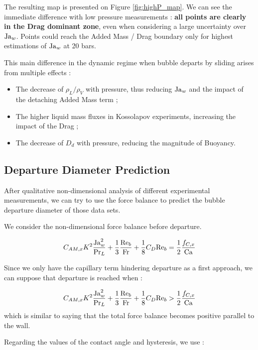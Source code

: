 The resulting map is presented on Figure \ref{fig:highP_map}. We can see the immediate difference with low pressure measurements : \textbf{all points are clearly in the Drag dominant zone}, even when considering a large uncertainty over $\mathrm{Ja}_{w}$. Points could reach the Added Mass / Drag boundary only for highest estimations of $\mathrm{Ja}_{w}$ at 20 bars. 

This main difference in the dynamic regime when bubble departs by sliding arises from multiple effects :

\begin{itemize}
\item The decrease of $\rho_{L}/\rho_{V}$ with pressure, thus reducing $\mathrm{Ja}_{w}$ and the impact of the detaching Added Mass term ;
\item The higher liquid mass fluxes in Kossolapov experiments, increasing the impact of the Drag ;
\item The decrease of $D_{d}$ with pressure, reducing the magnitude of Buoyancy.
\end{itemize}


\subsection{Departure Diameter Prediction}\label{subsec:Dd_pred}


After qualitative non-dimensional analysis of different experimental measurements, we can try to use the force balance to predict the bubble departure diameter of those data sets. 

We consider the non-dimensional force balance before departure.

\begin{equation}
C_{AM,x}K^{2} \frac{\mathrm{Ja}_{w}^{2}}{\mathrm{Pr}_{L}} + \frac{1}{3}\frac{\mathrm{Re}_{b}}{\mathrm{Fr}} + \frac{1}{8}C_{D}\mathrm{Re}_{b} = \frac{1}{2} \frac{f_{C,x}}{\mathrm{Ca}}
\end{equation}


Since we only have the capillary term hindering departure as a first approach, we can suppose that departure is reached when :

\begin{equation}
C_{AM,x}K^{2} \frac{\mathrm{Ja}_{w}^{2}}{\mathrm{Pr}_{L}} + \frac{1}{3}\frac{\mathrm{Re}_{b}}{\mathrm{Fr}} + \frac{1}{8}C_{D}\mathrm{Re}_{b} > \frac{1}{2} \frac{f_{C,x}}{\mathrm{Ca}}
\label{eq:pred_nogr}
\end{equation}
which is similar to saying that the total force balance becomes positive parallel to the wall.

\npar
Regarding the values of the contact angle and hysteresis, we use :

